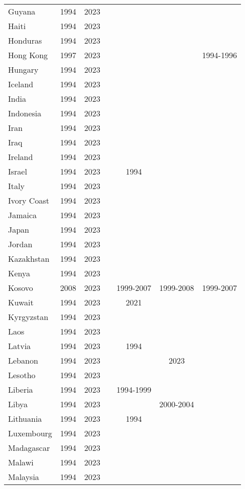 {\begin{longtable}{lcccccc}
Guyana & 1994 & 2023 &  &  &  & \\
Haiti & 1994 & 2023 &  &  &  & \\
Honduras & 1994 & 2023 &  &  &  & \\
Hong Kong & 1997 & 2023 &  &  &  & 1994-1996\\
\addlinespace
Hungary & 1994 & 2023 &  &  &  & \\
Iceland & 1994 & 2023 &  &  &  & \\
India & 1994 & 2023 &  &  &  & \\
Indonesia & 1994 & 2023 &  &  &  & \\
Iran & 1994 & 2023 &  &  &  & \\
\addlinespace
Iraq & 1994 & 2023 &  &  &  & \\
Ireland & 1994 & 2023 &  &  &  & \\
Israel & 1994 & 2023 &  & 1994 &  & \\
Italy & 1994 & 2023 &  &  &  & \\
Ivory Coast & 1994 & 2023 &  &  &  & \\
\addlinespace
Jamaica & 1994 & 2023 &  &  &  & \\
Japan & 1994 & 2023 &  &  &  & \\
Jordan & 1994 & 2023 &  &  &  & \\
Kazakhstan & 1994 & 2023 &  &  &  & \\
Kenya & 1994 & 2023 &  &  &  & \\
\addlinespace
Kosovo & 2008 & 2023 &  & 1999-2007 & 1999-2008 & 1999-2007\\
Kuwait & 1994 & 2023 &  & 2021 &  & \\
Kyrgyzstan & 1994 & 2023 &  &  &  & \\
Laos & 1994 & 2023 &  &  &  & \\
Latvia & 1994 & 2023 &  & 1994 &  & \\
\addlinespace
Lebanon & 1994 & 2023 &  &  & 2023 & \\
Lesotho & 1994 & 2023 &  &  &  & \\
Liberia & 1994 & 2023 &  & 1994-1999 &  & \\
Libya & 1994 & 2023 &  &  & 2000-2004 & \\
Lithuania & 1994 & 2023 &  & 1994 &  & \\
\addlinespace
Luxembourg & 1994 & 2023 &  &  &  & \\
Madagascar & 1994 & 2023 &  &  &  & \\
Malawi & 1994 & 2023 &  &  &  & \\
Malaysia & 1994 & 2023 &  &  &  & \\

\end{longtable}}
